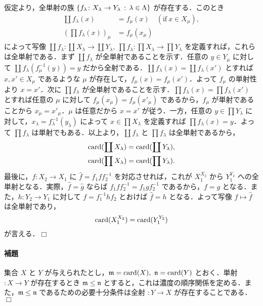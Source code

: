 \documentclass[pandoc,base=10pt,b5j,precisetext]{bxjsarticle}
\let\oldparagraph\paragraph
\renewcommand{\paragraph}[1]{\oldparagraph{#1}\mbox{}}
\begin{document}
仮定より，全単射の族
\(\{ f_\lambda \colon X_\lambda \to Y_\lambda \,:\, \lambda \in \Lambda \}\)
が存在する．このとき \begin{align*}
\coprod f_\lambda (x) &= f_{\mu}(x) \quad (\text{if}\ x \in X_\mu),\\
\left(\prod f_\lambda (x)\right)_\mu &= f_\mu (x_\mu)
\end{align*} によって写像
\(\coprod f_\lambda \colon \coprod X_\lambda \to \coprod Y_\lambda,\ \prod f_\lambda \colon \prod X_\lambda \to \prod Y_\lambda\)
を定義すれば，これらは全単射である．まず \(\coprod f_\lambda\)
が全単射であることを示す．任意の \(y \in Y_\mu\) に対して
\(\coprod f_\lambda(f_\mu^{-1}(y)) = y\)
だから全射である．\(\coprod f_\lambda (x) = \coprod f_\lambda (x')\)
とすれば \(x, x' \in X_\mu\) であるような \(\mu\)
が存在して，\(f_\mu (x) = f_\mu (x')\)．よって \(f_\mu\) の単射性より
\(x = x'\)．次に \(\prod f_\lambda\)
が全単射であることを示す．\(\prod f_\lambda (x) = \prod f_\lambda (x')\)
とすれば任意の \(\mu\) に対して \(f_\mu(x_\mu) = f_\mu (x'_\mu)\)
であるから，\(f_\mu\) が単射であることから \(x_\mu = x'_\mu\)．\(\mu\)
は任意だから \(x = x'\) が従う．一方，任意の \(y \in \prod Y_\lambda\)
に対して，\(x_\lambda = f_\lambda^{-1}(y_\lambda)\) によって
\(x \in \prod X_\lambda\) を定義すれば
\(\prod f_\lambda (x) = y\)．よって \(\prod f_\lambda\)
は単射でもある．以上より，\(\coprod f_\lambda\) と \(\prod f_\lambda\)
は全単射であるから， \begin{align*}
\mathop{\mathrm{card}}\nolimits(\coprod X_\lambda) &= \mathop{\mathrm{card}}\nolimits(\coprod Y_\lambda),\\
\mathop{\mathrm{card}}\nolimits(\prod X_\lambda) &= \mathop{\mathrm{card}}\nolimits(\prod Y_\lambda).
\end{align*} 最後に，\(f \colon X_2 \to X_1\) に
\(\hat f = f_1ff_2^{-1}\) を対応させれば，これが \(X_1^{X_2}\) から
\(Y_1^{Y_2}\) への全単射となる．実際，\(\hat f = \hat g\) ならば
\(f_1ff_2^{-1} = f_1gf_2^{-1}\) であるから，\(f = g\)
となる．また，\(h \colon Y_2 \to Y_1\) に対して \(f = f_1^{-1}hf_2\)
とおけば \(\hat f = h\) となる．よって写像 \(f \mapsto \hat f\)
は全単射であり， \[
\mathop{\mathrm{card}}\nolimits(X_1^{X_2}) = \mathop{\mathrm{card}}\nolimits(Y_1^{Y_2})
\] が言える．\(\Box\)

\hypertarget{ux88dcux984c-1}{%
\paragraph{補題}\label{ux88dcux984c-1}}

集合 \(X\) と \(Y\)
が与えられたとし，\(\mathfrak m = \card(X),\ \mathfrak n = \card(Y)\)
とおく．単射 \(\colon X \to Y\) が存在するとき
\(\mathfrak m \le \mathfrak n\)
とすると，これは濃度の順序関係を定める．また，\(\mathfrak m \le \mathfrak n\)
であるための必要十分条件は全射 \(\colon Y \to X\)
が存在することである．\(\Box\)
\end{document}
